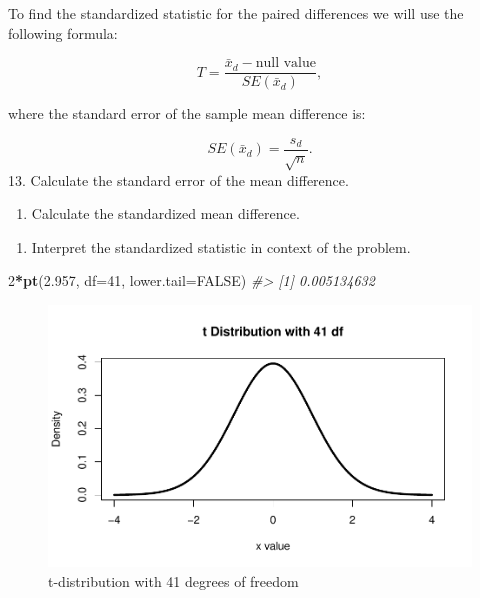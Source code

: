\documentclass[
]{report}
\newenvironment{Shaded}{\begin{snugshade}}{\end{snugshade}}
\newcommand{\AttributeTok}[1]{\textcolor[rgb]{0.13,0.29,0.53}{#1}}
\newcommand{\CommentTok}[1]{\textcolor[rgb]{0.56,0.35,0.01}{\textit{#1}}}
\newcommand{\ConstantTok}[1]{\textcolor[rgb]{0.56,0.35,0.01}{#1}}
\newcommand{\DecValTok}[1]{\textcolor[rgb]{0.00,0.00,0.81}{#1}}
\newcommand{\FloatTok}[1]{\textcolor[rgb]{0.00,0.00,0.81}{#1}}
\newcommand{\FunctionTok}[1]{\textcolor[rgb]{0.13,0.29,0.53}{\textbf{#1}}}
\newcommand{\NormalTok}[1]{#1}
\newcommand{\SpecialCharTok}[1]{\textcolor[rgb]{0.81,0.36,0.00}{\textbf{#1}}}
\providecommand{\tightlist}{%
  \setlength{\itemsep}{0pt}\setlength{\parskip}{0pt}}
\begin{document}
\vspace{0.8in}

To find the standardized statistic for the paired differences we will use the following formula:

\[T = \frac{\bar{x}_d - \text{null value}}{SE(\bar{x}_d)},\]

where the standard error of the sample mean difference is:

\[SE(\bar{x}_d)=\frac{s_d}{\sqrt{n}}.\]
13. Calculate the standard error of the mean difference.

\vspace{0.8in}

\begin{enumerate}
\def\labelenumi{\arabic{enumi}.}
\setcounter{enumi}{13}
\tightlist
\item
  Calculate the standardized mean difference.
\end{enumerate}

\vspace{0.8in}

\begin{enumerate}
\def\labelenumi{\arabic{enumi}.}
\setcounter{enumi}{14}
\tightlist
\item
  Interpret the standardized statistic in context of the problem.
\end{enumerate}

\vspace{0.8in}

\begin{Shaded}
\begin{Highlighting}[]
\DecValTok{2}\SpecialCharTok{*}\FunctionTok{pt}\NormalTok{(}\FloatTok{2.957}\NormalTok{, }\AttributeTok{df=}\DecValTok{41}\NormalTok{, }\AttributeTok{lower.tail=}\ConstantTok{FALSE}\NormalTok{)}
\CommentTok{\#\textgreater{} [1] 0.005134632}
\end{Highlighting}
\end{Shaded}

\newpage

\begin{figure}

{\centering \includegraphics[width=0.7\linewidth]{14-UR-module11_review_files/figure-latex/pvalue-1} 

}

\caption{t-distribution with 41 degrees of freedom}\label{fig:pvalue}
\end{figure}
\end{document}
